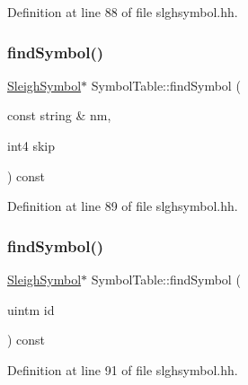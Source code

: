 Definition at line 88 of file slghsymbol.\+hh.

\mbox{\label{class_symbol_table_af9e38cf4a6423e179b08d1fc74a85d39}} 
\subsubsection{\texorpdfstring{findSymbol()}{findSymbol()}\hspace{0.1cm}{\footnotesize\ttfamily [2/3]}}
{\footnotesize\ttfamily \mbox{\hyperlink{class_sleigh_symbol}{Sleigh\+Symbol}}$\ast$ Symbol\+Table\+::find\+Symbol (\begin{DoxyParamCaption}\item[{const string \&}]{nm,  }\item[{int4}]{skip }\end{DoxyParamCaption}) const\hspace{0.3cm}{\ttfamily [inline]}}



Definition at line 89 of file slghsymbol.\+hh.

\mbox{\label{class_symbol_table_aa4fcf3260ef36229e7a1ba1a89a2cf15}} 
\subsubsection{\texorpdfstring{findSymbol()}{findSymbol()}\hspace{0.1cm}{\footnotesize\ttfamily [3/3]}}
{\footnotesize\ttfamily \mbox{\hyperlink{class_sleigh_symbol}{Sleigh\+Symbol}}$\ast$ Symbol\+Table\+::find\+Symbol (\begin{DoxyParamCaption}\item[{uintm}]{id }\end{DoxyParamCaption}) const\hspace{0.3cm}{\ttfamily [inline]}}



Definition at line 91 of file slghsymbol.\+hh.

\mbox{\label{class_symbol_table_ab0831c894cb828ab8e7b307ec82a0772}} 
